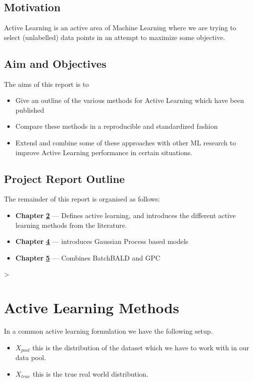 \documentclass[12pt, a4paper]{report}
\theoremstyle{definition}
\theoremstyle{definition}
\theoremstyle{definition}
\begin{document}
\section{Motivation}

Active Learning is an active area of Machine Learning where we are trying to select (unlabelled) data points in an attempt to maximize some objective.
\section{Aim and Objectives}

The aims of this report is to

\begin{itemize}
    \item Give an outline of the various methods for Active Learning which have been published
    \item Compare these methods in a reproducible and standardized fashion
    \item Extend and combine some of these approaches with other ML research to improve Active Learning performance in certain situations.
\end{itemize}
\section{Project Report Outline}
The remainder of this report is organised as follows:
\begin{itemize}
    \item[] \textbf{Chapter} \hyperref[Chap2]{\textbf{2}} --- Defines active learning, and introduces the different active learning methods from the literature.
    \item[] \textbf{Chapter} \hyperref[Gaussian Processes]{\textbf{4}} --- introduces Gaussian Process based models
    \item[] \textbf{Chapter} \hyperref[Chap5]{\textbf{5}} --- Combines BatchBALD and GPC
\end{itemize}
>

\chapter{Active Learning Methods}
\label{Chap2}

In a common active learning formulation we have the following setup.

\begin{itemize}
    \item $X_{pool}$ this is the distribution of the dataset which we have to work with in our data pool.
    \item $X_{true}$ this is the true real world distribution.
\end{itemize}
\end{document}
